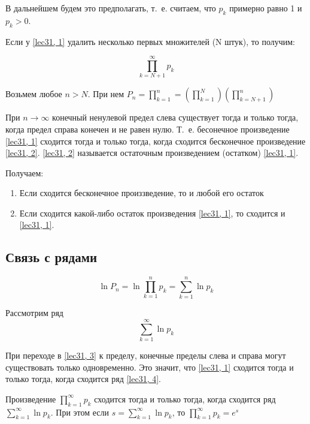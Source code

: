\documentclass[../../main.tex]{subfiles}
\begin{document}
	В дальнейшем будем это предполагать, т.~е. считаем, что $p_k$ примерно равно 
	1 и $p_k > 0$.
		
	Если у \eqref{lec31, 1} удалить несколько первых множителей (N штук), то 
	получим:
		
	\begin{equation} \label{lec31, 2}
	\prod\limits_{k = N + 1}^{\infty} p_k
	\end{equation}
		
	Возьмем любое $n > N$. При нем $P_n = \prod\limits_{k = 1}^{n} = 
	\left(\prod\limits_{k = 1}^{N}\right)\left(\prod\limits_{k = N + 
	1}^{n}\right)$
		
	При $n \to \infty$ конечный ненулевой предел слева существует тогда и только 
	тогда, когда предел справа конечен и не равен нулю. Т.~е. бесонечное 
	произведение \eqref{lec31, 1} сходится тогда и только тогда, когда сходится 
	бесконечное произведение \eqref{lec31, 2}. \eqref{lec31, 2} называется 
	остаточным произведением (остатком) \eqref{lec31, 1}.
		
	Получаем: 
		
	\begin{enumerate}[label={\alph*)}]
		\item Если сходится бесконечное произзведение, то и любой его остаток
			
		\item Если сходится какой-либо остаток произведения \eqref{lec31, 1}, то 
		сходится и \eqref{lec31, 1}.
		\end{enumerate}
	
	\subsection{Связь с рядами}
	
	\begin{equation}\label{lec31, 3}
	 \ln P_n = \ln \prod\limits_{k = 1}^{n} p_k = \sum\limits_{k = 1}^{n} \ln p_k
	\end{equation}
	
	Рассмотрим ряд
	\begin{equation}\label{lec31, 4}
	\sum\limits_{k = 1}^{\infty} \ln p_k
	\end{equation}
	
	При переходе в \eqref{lec31, 3} к пределу, конечные пределы слева и справа 
	могут существовать только одновременно. Это значит, что \eqref{lec31, 1} 
	сходится тогда и только тогда, когда сходится ряд \eqref{lec31, 4}.
	
	\begin{thm}\label{lec31:thm1} 
		Произведение $\prod\limits_{k = 1}^{\infty} p_k$ сходится тогда и только 
		тогда, когда сходится ряд $\sum\limits_{k = 1}^{\infty} \ln p_k$. При этом 
		если $s = \sum\limits_{k = 1}^{\infty} \ln p_k$, то $\prod\limits_{k = 
		1}^{\infty} p_k = e^s$
	\end{thm}
\end{document}
